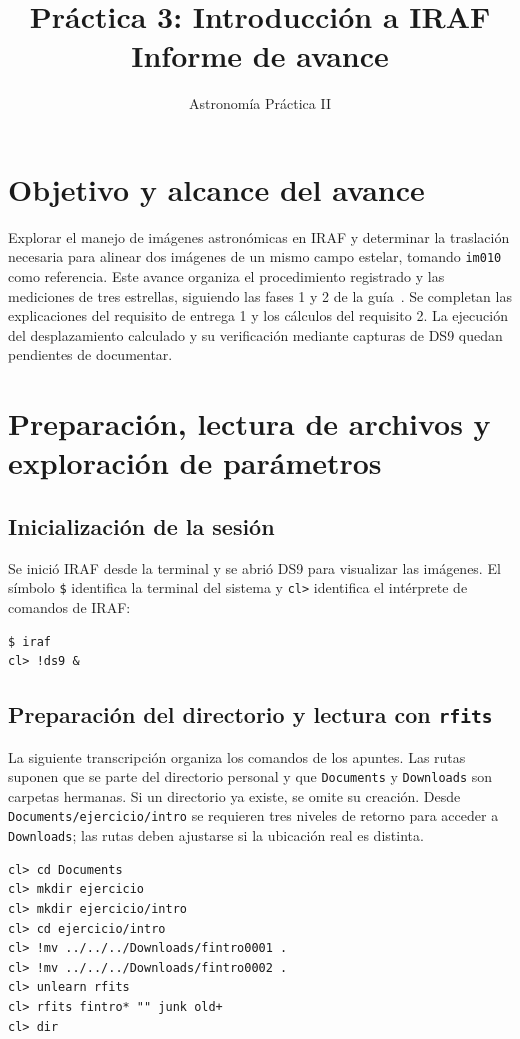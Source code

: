 \documentclass[11pt,a4paper]{article}
\title{Práctica 3: Introducción a IRAF\\
\large Informe de avance}
\author{Astronomía Práctica II}
\date{}
\begin{document}
\maketitle

\section*{Objetivo y alcance del avance}
Explorar el manejo de imágenes astronómicas en IRAF y determinar la
traslación necesaria para alinear dos imágenes de un mismo campo estelar,
tomando \texttt{im010} como referencia. Este avance organiza el procedimiento
registrado y las mediciones de tres estrellas, siguiendo las fases 1 y 2
de la guía~\cite{guia}. Se completan las explicaciones del requisito de
entrega 1 y los cálculos del requisito 2. La ejecución del desplazamiento
calculado y su verificación mediante capturas de DS9 quedan pendientes de
documentar.

\section{Preparación, lectura de archivos y exploración de parámetros}

\subsection{Inicialización de la sesión}
Se inició IRAF desde la terminal y se abrió DS9 para visualizar las imágenes.
El símbolo \texttt{\$} identifica la terminal del sistema y \texttt{cl>}
identifica el intérprete de comandos de IRAF:
\begin{verbatim}
$ iraf
cl> !ds9 &
\end{verbatim}

\subsection{Preparación del directorio y lectura con \texttt{rfits}}
La siguiente transcripción organiza los comandos de los apuntes.
Las rutas suponen que se parte del directorio personal y que
\texttt{Documents} y \texttt{Downloads} son carpetas hermanas. Si un
directorio ya existe, se omite su creación. Desde
\texttt{Documents/ejercicio/intro} se requieren tres niveles de retorno
para acceder a \texttt{Downloads}; las rutas deben ajustarse si la
ubicación real es distinta.
\begin{verbatim}
cl> cd Documents
cl> mkdir ejercicio
cl> mkdir ejercicio/intro
cl> cd ejercicio/intro
cl> !mv ../../../Downloads/fintro0001 .
cl> !mv ../../../Downloads/fintro0002 .
cl> unlearn rfits
cl> rfits fintro* "" junk old+
cl> dir
\end{verbatim}
\end{document}
